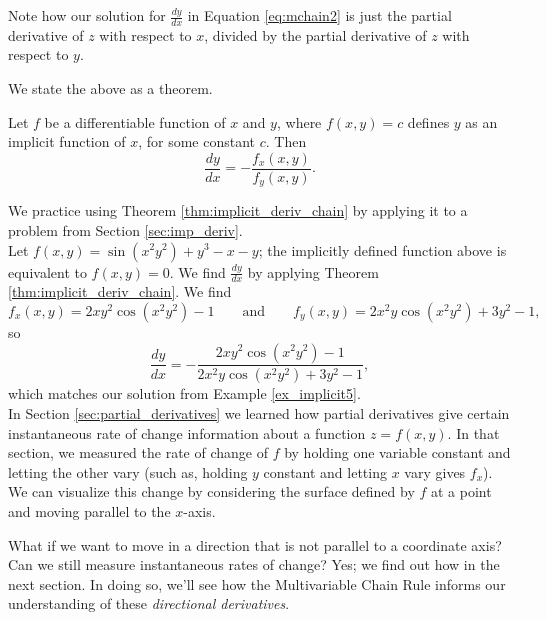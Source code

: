 Note how our solution for $\frac{dy}{dx}$ in Equation \eqref{eq:mchain2} is just the partial derivative of $z$ with respect to $x$, divided by the partial derivative of $z$ with respect to $y$.

We state the above as a theorem.

{Let $f$ be a differentiable function of $x$ and $y$, where $f(x,y)=c$ defines $y$ as  an implicit function of $x$, for some constant $c$. Then
$$\frac{dy}{dx} = - \frac{f_x(x,y)}{f_y(x,y)}.$$
}

We practice using Theorem \ref{thm:implicit_deriv_chain} by applying it to a problem from Section \ref{sec:imp_deriv}.\\

{Let $f(x,y) = \sin(x^2y^2)+y^3-x-y$; the implicitly defined function above is equivalent to $f(x,y)=0$. We find $\frac{dy}{dx}$ by applying Theorem \ref{thm:implicit_deriv_chain}. We find 
$$f_x(x,y) = 2xy^2\cos(x^2y^2)-1\qquad \text{and}\qquad f_y(x,y) = 2x^2y\cos(x^2y^2)+3y^2-1,$$
so 
$$\frac{dy}{dx} = -\frac{2xy^2\cos(x^2y^2)-1}{2x^2y\cos(x^2y^2)+3y^2-1},$$
which matches our solution from Example \ref{ex_implicit5}.
}\\

In Section \ref{sec:partial_derivatives} we learned how partial derivatives give certain instantaneous rate of change information about a function $z=f(x,y)$. In that section, we measured the rate of change of $f$ by holding one variable constant and letting the other vary (such as, holding $y$ constant and letting $x$ vary gives $f_x$). We can visualize this change by considering the surface defined by $f$ at a point and moving parallel to the $x$-axis.

What if we want to move in a direction that is not parallel to a coordinate axis? Can we still measure instantaneous rates of change? Yes; we find out how in the next section. In doing so, we'll see how the Multivariable Chain Rule informs our understanding of these \emph{directional derivatives}.


